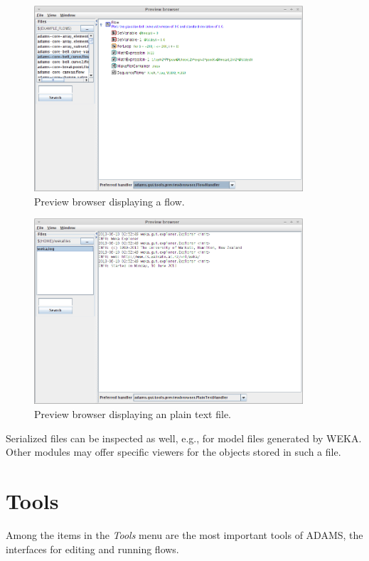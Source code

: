 \begin{figure}[htb]
  \centering
  \includegraphics[width=10.0cm]{images/previewbrowser-flow1.png}
  \caption{Preview browser displaying a flow.}
  \label{previewbrowser-flow1}
\end{figure}

\begin{figure}[htb]
  \centering
  \includegraphics[width=10.0cm]{images/previewbrowser-plaintext1.png}
  \caption{Preview browser displaying an plain text file.}
  \label{previewbrowser-plaintext1}
\end{figure}

Serialized files can be inspected as well, e.g., for model files generated 
by WEKA. Other modules may offer specific viewers for the objects stored
in such a file.


\chapter{Tools}
Among the items in the \textit{Tools} menu are the most important tools of 
ADAMS, the interfaces for editing and running flows.

